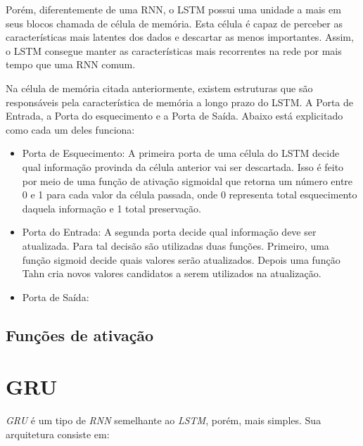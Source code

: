 
Porém, diferentemente de uma \acrshort{RNN}, o LSTM possui uma unidade a mais em seus blocos chamada de célula de memória. Esta célula é capaz de perceber as características mais latentes dos dados e descartar as menos importantes. Assim, o \acrshort{LSTM} consegue manter as características mais recorrentes na rede por mais tempo que uma \acrshort{RNN} comum. 

Na célula de memória citada anteriormente, existem estruturas que são responsáveis pela característica de memória a longo prazo do \acrshort{LSTM}. A Porta de Entrada, a Porta do esquecimento e a Porta de Saída. Abaixo está explicitado como cada um deles funciona:

\begin{itemize}
  \item Porta de Esquecimento: A primeira porta de uma célula do \acrfull{LSTM} decide qual informação provinda da célula anterior vai ser descartada. Isso é feito por meio de uma função de ativação sigmoidal que retorna um número entre 0 e 1 para cada valor da célula passada, onde 0 representa total esquecimento daquela informação e 1 total preservação.
  
  \item Porta do Entrada: A segunda porta decide qual informação deve ser atualizada. Para tal decisão são utilizadas duas funções. Primeiro, uma função sigmoid decide quais valores serão atualizados. Depois uma função Tahn cria novos valores candidatos a serem utilizados na atualização.
  \item Porta de Saída:
\end{itemize}


\subsection{Funções de ativação}

\section{\acrfull{GRU}}

\textit{\acrshort{GRU}} é um tipo de \textit{\acrshort{RNN}} semelhante ao \textit{\acrshort{LSTM}}, porém, mais simples. Sua arquitetura consiste em:

